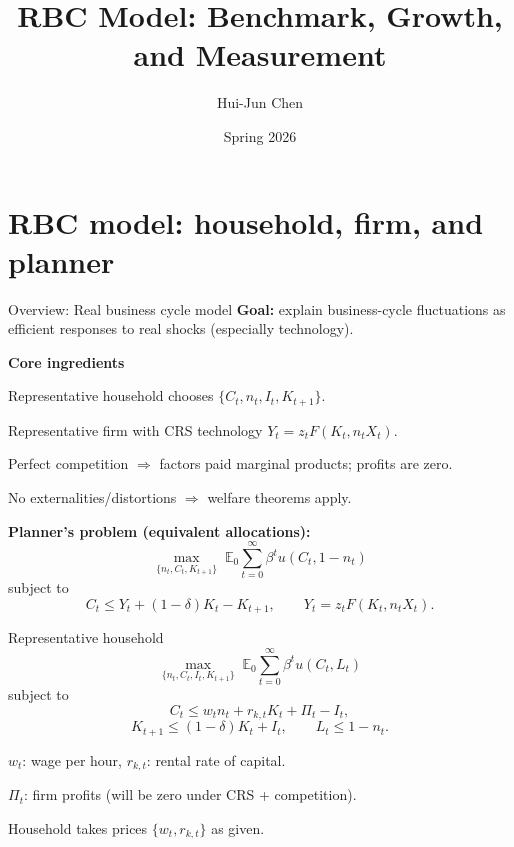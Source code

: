 \documentclass[aspectratio=169,xcolor=dvipsnames]{beamer}
\title[Topic 1B+C]{RBC Model: Benchmark, Growth, and Measurement}
\author[Hui-Jun Chen]{Hui-Jun Chen}
\institute[]{National Tsing Hua University\\ Department of Economics}
\date{Spring 2026}
\let\tempone\itemize
\let\temptwo\enditemize
\renewenvironment{itemize}{\tempone\addtolength{\itemsep}{\fill}}{\temptwo}
\begin{document}
\begin{frame}
    \titlepage
\end{frame}

\section[RBC]{RBC model: household, firm, and planner}

\begin{frame}{Overview: Real business cycle model}
\label{slide:BC_Overview}
\small
\textbf{Goal:} explain business-cycle fluctuations as efficient responses to real shocks (especially technology).

\vspace{0.4em}
\textbf{Core ingredients}
\begin{itemize}
    \item Representative household chooses \(\{C_t, n_t, I_t, K_{t+1}\}\).
    \item Representative firm with CRS technology \(Y_t = z_t F(K_t, n_t X_t)\).
    \item Perfect competition \(\Rightarrow\) factors paid marginal products; profits are zero.
    \item No externalities/distortions \(\Rightarrow\) welfare theorems apply.
\end{itemize}

\vspace{0.6em}
\textbf{Planner's problem (equivalent allocations):}
\[
\max_{\{n_t,C_t,K_{t+1}\}}\; \mathbb{E}_0\sum_{t=0}^{\infty}\beta^t u(C_t,1-n_t)
\]
subject to
\[
C_t \le Y_t + (1-\delta)K_t - K_{t+1},
\qquad
Y_t = z_t F(K_t, n_t X_t).
\]
\end{frame}

\begin{frame}{Representative household}
\label{slide:BC_HH}
\small
\[
\max_{\{n_t,C_t,I_t,K_{t+1}\}} \; \mathbb{E}_0\sum_{t=0}^{\infty}\beta^t u(C_t,L_t)
\]
subject to
\[
C_t \le w_t n_t + r_{k,t}K_t + \Pi_t - I_t,
\]
\[
K_{t+1} \le (1-\delta)K_t + I_t,
\qquad
L_t \le 1-n_t.
\]
\begin{itemize}
    \item \(w_t\): wage per hour, \(r_{k,t}\): rental rate of capital.
    \item \(\Pi_t\): firm profits (will be zero under CRS + competition).
    \item Household takes prices \(\{w_t,r_{k,t}\}\) as given.
\end{itemize}
\end{frame}
\end{document}
